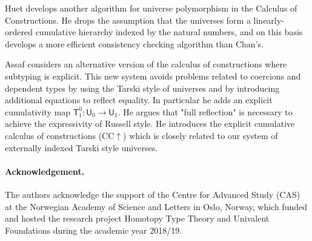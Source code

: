 \documentclass[11pt,a4paper]{article}
\def\UU{\mathsf{U}}
\newcommand{\T}{\mathsf{T}}
\begin{document}
Huet \cite{Huet87} develops another algorithm for universe polymorphism in the Calculus of Constructions. He drops the assumption that the universes form a linearly-ordered cumulative hierarchy indexed by the natural numbers, and on this basis develops a more efficient consistency checking algorithm than Chan's.

Assaf \cite{Assaf14} considers an alternative version of the calculus of
constructions where subtyping is explicit. This new system avoids problems related to coercions and dependent types by using the Tarski style
of universes and by introducing additional equations to reflect equality. In particular he adds an explicit cumulativity map $\T^0_1 : \UU_0 \to \UU_1$. He argues that "full reflection" is necessary to achieve the expressivity of Russell style. He introduces the explicit cumulative calculus of constructions (CC$\uparrow$) which is closely related to our system of externally indexed Tarski style universes.

\paragraph{Acknowledgement.}
The authors acknowledge the support of the Centre for Advanced Study (CAS)
at the Norwegian Academy of Science and Letters
in Oslo, Norway, which funded and hosted the research project Homotopy
Type Theory and Univalent Foundations during the academic year 2018/19.


\end{document}
